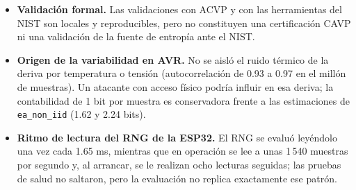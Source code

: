 \begin{itemize}
    \item \textbf{Validación formal.} Las validaciones con ACVP y con las herramientas del NIST son locales y reproducibles, pero no constituyen una certificación CAVP ni una validación de la fuente de entropía ante el NIST.
    \item \textbf{Origen de la variabilidad en AVR.} No se aisló el ruido térmico de la deriva por temperatura o tensión (autocorrelación de 0.93 a 0.97 en el millón de muestras). Un atacante con acceso físico podría influir en esa deriva; la contabilidad de 1 bit por muestra es conservadora frente a las estimaciones de \texttt{ea\_non\_iid} (1.62 y 2.24 bits).
    \item \textbf{Ritmo de lectura del RNG de la ESP32.} El RNG se evaluó leyéndolo una vez cada 1.65 ms, mientras que en operación se lee a unas 1\,540 muestras por segundo y, al arrancar, se le realizan ocho lecturas seguidas; las pruebas de salud no saltaron, pero la evaluación no replica exactamente ese patrón.
\end{itemize}
